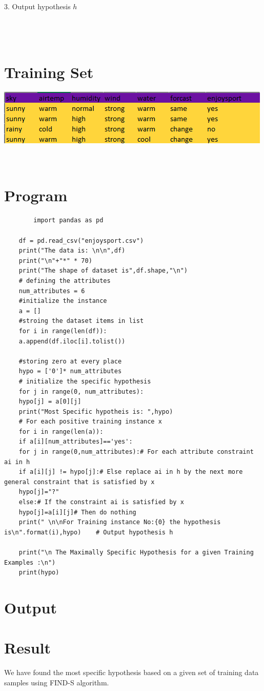 \documentclass[a4paper]{article}
\begin{document}
	3. Output hypothesis $h$
	\\\
	\\
	\\
	\\
	
	\section{Training Set}
	\includegraphics[scale=1.3]{enjoysport.png}\\
	\\
	\\
	\newpage
	\section{Program}
	\begin{verbatim}
		import pandas as pd
	
	df = pd.read_csv("enjoysport.csv")
	print("The data is: \n\n",df)
	print("\n"+"*" * 70)
	print("The shape of dataset is",df.shape,"\n")
	# defining the attributes
	num_attributes = 6
	#initialize the instance
	a = []
	#stroing the dataset items in list
	for i in range(len(df)):
	a.append(df.iloc[i].tolist())
	
	#storing zero at every place 
	hypo = ['0']* num_attributes
	# initialize the specific hypothesis
	for j in range(0, num_attributes):
	hypo[j] = a[0][j]
	print("Most Specific hypotheis is: ",hypo)
	# For each positive training instance x
	for i in range(len(a)):
	if a[i][num_attributes]=='yes':
	for j in range(0,num_attributes):# For each attribute constraint ai in h
	if a[i][j] != hypo[j]:# Else replace ai in h by the next more general constraint that is satisfied by x
	hypo[j]="?"
	else:# If the constraint ai is satisfied by x
	hypo[j]=a[i][j]# Then do nothing
	print(" \n\nFor Training instance No:{0} the hypothesis is\n".format(i),hypo)    # Output hypothesis h       
	
	print("\n The Maximally Specific Hypothesis for a given Training Examples :\n")
	print(hypo)
	\end{verbatim}
	\section{Output}
	\section{Result}
	We have found the most specific hypothesis based on a given set of training data samples using FIND-S algorithm.
\end{document}
